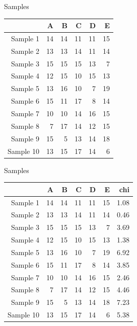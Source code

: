 \documentclass{beamer}
\begin{document}
\begin{frame}{Samples}

\begin{table}[ht]
\centering
\begin{tabular}{rrrrrr}
  \hline
 & A & B & C & D & E \\ 
  \hline
Sample 1 &  14 &  14 &  11 &  11 &  15 \\ 
  Sample 2 &  13 &  13 &  14 &  11 &  14 \\ 
  Sample 3 &  15 &  15 &  15 &  13 &   7 \\ 
  Sample 4 &  12 &  15 &  10 &  15 &  13 \\ 
  Sample 5 &  13 &  16 &  10 &   7 &  19 \\ 
  Sample 6 &  15 &  11 &  17 &   8 &  14 \\ 
  Sample 7 &  10 &  10 &  14 &  16 &  15 \\ 
  Sample 8 &   7 &  17 &  14 &  12 &  15 \\ 
  Sample 9 &  15 &   5 &  13 &  14 &  18 \\ 
  Sample 10 &  13 &  15 &  17 &  14 &   6 \\ 
   \hline
\end{tabular}
\end{table}

\end{frame}

\begin{frame}{Samples}
\begin{table}[ht]
\centering
\begin{tabular}{rrrrrrr}
  \hline
 & A & B & C & D & E & chi \\ 
  \hline
Sample 1 & 14 & 14 & 11 & 11 & 15 & 1.08 \\ 
  Sample 2 & 13 & 13 & 14 & 11 & 14 & 0.46 \\ 
  Sample 3 & 15 & 15 & 15 & 13 & 7 & 3.69 \\ 
  Sample 4 & 12 & 15 & 10 & 15 & 13 & 1.38 \\ 
  Sample 5 & 13 & 16 & 10 & 7 & 19 & 6.92 \\ 
  Sample 6 & 15 & 11 & 17 & 8 & 14 & 3.85 \\ 
  Sample 7 & 10 & 10 & 14 & 16 & 15 & 2.46 \\ 
  Sample 8 & 7 & 17 & 14 & 12 & 15 & 4.46 \\ 
  Sample 9 & 15 & 5 & 13 & 14 & 18 & 7.23 \\ 
  Sample 10 & 13 & 15 & 17 & 14 & 6 & 5.38 \\ 
   \hline
\end{tabular}
\end{table}

\end{frame}
\end{document}
